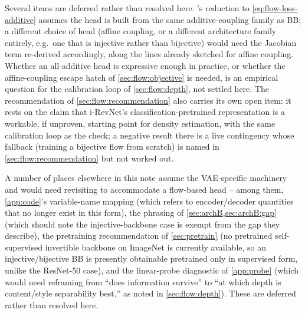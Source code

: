 Several items are deferred rather than resolved here. 's reduction to
\cref{eq:flow-loss-additive} assumes the head is built from the same additive-coupling family as BB; a
different choice of head (affine coupling, or a different architecture family entirely, e.g.\ one that is
injective rather than bijective) would need the Jacobian term re-derived accordingly, along the lines
already sketched for affine coupling. Whether an all-additive head is expressive enough in practice, or
whether the affine-coupling escape hatch of \cref{sec:flow:objective} is needed, is an empirical question
for the calibration loop of \cref{sec:flow:depth}, not settled here. The recommendation of
\cref{sec:flow:recommendation} also carries its own open item: it rests on the claim that i-RevNet's
classification-pretrained representation is a workable, if unproven, starting point for density
estimation, with the same calibration loop as the check; a negative result there is a live contingency
whose fallback (training a bijective flow from scratch) is named in \cref{sec:flow:recommendation} but
not worked out.

A number of places elsewhere in this note assume the VAE-specific machinery and would need revisiting to
accommodate a flow-based head -- among them, \cref{app:code}'s variable-name mapping (which refers to
encoder/decoder quantities that no longer exist in this form), the phrasing of
\cref{sec:archB,sec:archB:gap} (which should note the injective-backbone case is exempt from the gap they
describe), the pretraining recommendation of \cref{sec:pretrain} (no pretrained self-supervised invertible
backbone on ImageNet is currently available, so an injective/bijective BB is presently obtainable
pretrained only in supervised form, unlike the ResNet-50 case), and the linear-probe diagnostic of
\cref{app:probe} (which would need reframing from ``does information survive'' to ``at which depth is
content/style separability best,'' as noted in \cref{sec:flow:depth}). These are deferred rather than
resolved here.